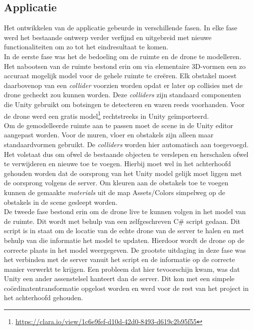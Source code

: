 \subsection{Applicatie} \label{sec:unity}
Het ontwikkelen van de applicatie gebeurde in verschillende fasen. In elke fase werd het bestaande ontwerp verder verfijnd en uitgebreid met nieuwe functionaliteiten om zo tot het eindresultaat te komen.\\

In de eerste fase was het de bedoeling om de ruimte en de drone te modelleren.
Het nabootsen van de ruimte bestond erin om via elementaire 3D-vormen een zo accuraat mogelijk model voor de gehele ruimte te creëren.
Elk obstakel moest daarbovenop van een \textit{collider} voorzien worden opdat er later op collisies met de drone gecheckt zou kunnen worden.
Deze \textit{colliders} zijn standaard componenten die Unity gebruikt om botsingen te detecteren en waren reeds voorhanden.
Voor de drone werd een gratis model\footnote{\url{https://clara.io/view/1c6e9fef-d10d-42d0-8493-d619c2b95f55}} rechtstreeks in Unity geïmporteerd.\\

Om de gemodelleerde ruimte aan te passen moet de scene in de Unity editor aangepast worden.
Voor de muren, vloer en obstakels zijn alleen maar standaardvormen gebruikt.
De \textit{colliders} worden hier automatisch aan toegevoegd.
Het volstaat dus om ofwel de bestaande objecten te verslepen en herschalen ofwel te verwijderen en nieuwe toe te voegen.
Hierbij moet wel in het achterhoofd gehouden worden dat de oorsprong van het Unity model gelijk moet liggen met de oorsprong volgens de server.
Om kleuren aan de obstakels toe te voegen kunnen de gemaakte \textit{materials} uit de map Assets/Colors simpelweg op de obstakels in de scene gesleept worden.\\

De tweede fase bestond erin om de drone live te kunnen volgen in het model van de ruimte.
Dit wordt met behulp van een zelfgeschreven C\# script gedaan.
Dit script is in staat om de locatie van de echte drone van de server te halen en met behulp van die informatie het model te updaten.
Hierdoor wordt de drone op de correcte plaats in het model weergegeven. De grootste uitdaging in deze fase was het verbinden met de server vanuit het script en de informatie op de correcte manier verwerkt te krijgen. Een probleem dat hier tevoorschijn kwam, was dat Unity een ander assenstelsel hanteert dan de server. Dit kon met een simpele coördinatentransformatie opgelost worden en werd voor de rest van het project in het achterhoofd gehouden.\\


